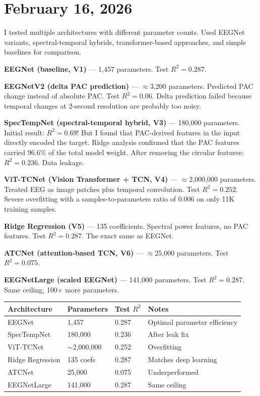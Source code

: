 \documentclass[11pt,letterpaper]{article}
\begin{document}
\section*{February 16, 2026}

I tested multiple architectures with different parameter counts. Used EEGNet variants,
spectral-temporal hybrids, transformer-based approaches, and simple baselines for comparison.

\textbf{EEGNet (baseline, V1)} --- 1,457 parameters. Test $R^2 = 0.287$.

\textbf{EEGNetV2 (delta PAC prediction)} --- $\approx$3,200 parameters. Predicted PAC change
instead of absolute PAC. Test $R^2 = 0.06$. Delta prediction failed because temporal changes
at 2-second resolution are probably too noisy.

\textbf{SpecTempNet (spectral-temporal hybrid, V3)} --- 180,000 parameters. Initial result:
$R^2 = 0.69$! But I found that PAC-derived features in the input directly encoded the target.
Ridge analysis confirmed that the PAC features carried 96.6\% of the total model weight. After
removing the circular features: $R^2 = 0.236$. Data leakage.

\textbf{ViT-TCNet (Vision Transformer + TCN, V4)} --- $\approx$2,000,000 parameters. Treated
EEG as image patches plus temporal convolution. Test $R^2 = 0.252$. Severe overfitting with a
samples-to-parameters ratio of 0.006 on only 11K training samples.

\textbf{Ridge Regression (V5)} --- 135 coefficients. Spectral power features, no PAC features.
Test $R^2 = 0.287$. The exact same as EEGNet.

\textbf{ATCNet (attention-based TCN, V6)} --- $\approx$25,000 parameters. Test $R^2 = 0.075$.

\textbf{EEGNetLarge (scaled EEGNet)} --- 141,000 parameters. Test $R^2 = 0.287$. Same ceiling,
100$\times$ more parameters.

\vspace{0.5em}
\begin{tabular}{@{}lllp{5cm}@{}}
\toprule
\textbf{Architecture} & \textbf{Parameters} & \textbf{Test $R^2$} & \textbf{Notes} \\
\midrule
EEGNet            & 1,457          & 0.287 & Optimal parameter efficiency \\
SpecTempNet       & 180,000        & 0.236 & After leak fix \\
ViT-TCNet         & $\sim$2,000,000 & 0.252 & Overfitting \\
Ridge Regression  & 135 coefs      & 0.287 & Matches deep learning \\
ATCNet            & 25,000         & 0.075 & Underperformed \\
EEGNetLarge       & 141,000        & 0.287 & Same ceiling \\
\bottomrule
\end{tabular}
\vspace{0.5em}
\end{document}
